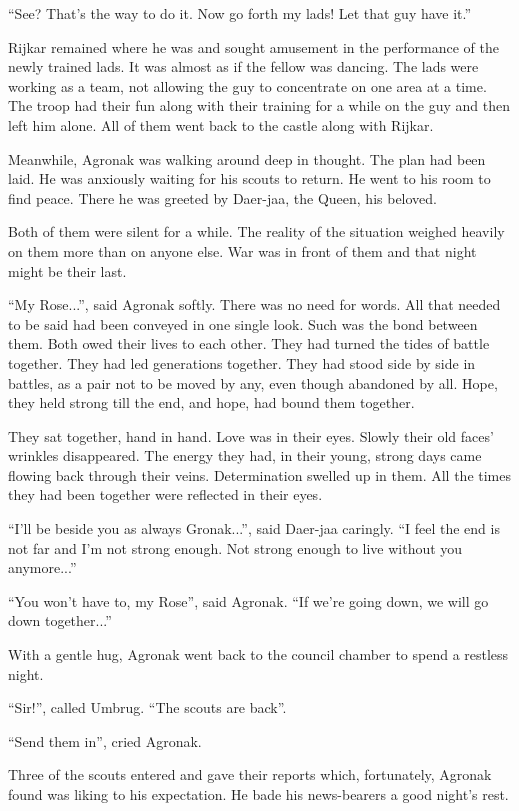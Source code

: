 \documentclass[twoside,11pt,titlepage]{article}
\begin{document}
``See? That's the way to do it. Now go forth my lads! Let that guy have it.''

Rijkar remained where he was and sought amusement in the performance of the newly trained lads. It was almost as if the fellow was dancing. The lads were working as a team, not allowing the guy to concentrate on one area at a time. The troop had their fun along with their training for a while on the guy and then left him alone. All of them went back to the castle along with Rijkar.

Meanwhile, Agronak was walking around deep in thought. The plan had been laid. He was anxiously waiting for his scouts to return. He went to his room to find peace. There he was greeted by Daer-jaa, the Queen, his beloved.

Both of them were silent for a while. The reality of the situation weighed heavily on them more than on anyone else. War was in front of them and that night might be their last.

``My Rose...'', said Agronak softly. There was no need for words. All that needed to be said had been conveyed in one single look. Such was the bond between them. Both owed their lives to each other. They had turned the tides of battle together. They had led generations together. They had stood side by side in battles, as a pair not to be moved by any, even though abandoned by all. Hope, they held strong till the end, and hope, had bound them together.

They sat together, hand in hand. Love was in their eyes. Slowly their old faces' wrinkles disappeared. The energy they had, in their young, strong days came flowing back through their veins. Determination swelled up in them. All the times they had been together were reflected in their eyes.

``I'll be beside you as always Gronak...'', said Daer-jaa caringly. ``I feel the end is not far and I'm not strong enough. Not strong enough to live without you anymore...''

``You won't have to, my Rose'', said Agronak. ``If we're going down, we will go down together...''

With a gentle hug, Agronak went back to the council chamber to spend a restless night.

``Sir!'', called Umbrug. ``The scouts are back''.

``Send them in'', cried Agronak.

Three of the scouts entered and gave their reports which, fortunately, Agronak found was liking to his expectation. He bade his news-bearers a good night's rest.
\end{document}
